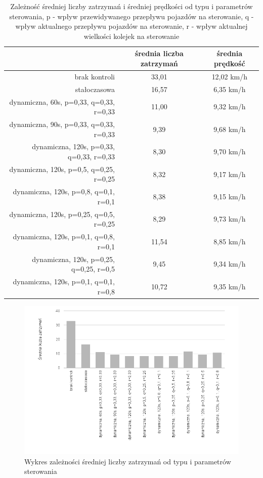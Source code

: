 \FloatBarrier
\begin{table}[h]
	\centering
	\begin{tabular}{ |r|c|c| }
		\hline
		& średnia liczba zatrzymań & średnia prędkość \\
		\hline
		brak kontroli                             & 33,01 & 12,02 km/h \\
		\hline
		stałoczasowa                              & 16,57 &  6,35 km/h \\
		\hline
		dynamiczna, 60s, p=0,33, q=0,33, r=0,33   & 11,00 &  9,32 km/h \\
		\hline
		dynamiczna, 90s, p=0,33, q=0,33, r=0,33   &  9,39 &  9,68 km/h \\
		\hline
		dynamiczna, 120s, p=0,33, q=0,33, r=0,33  &  8,30 &  9,70 km/h \\
		\hline
		dynamiczna, 120s, p=0,5, q=0,25, r=0,25   &  8,32 &  9,17 km/h \\
		\hline
		dynamiczna, 120s, p=0,8, q=0,1, r=0,1     &  8,38 &  9,15 km/h \\
		\hline
		dynamiczna, 120s, p=0,25, q=0,5, r=0,25   &  8,29 &  9,73 km/h \\
		\hline
		dynamiczna, 120s, p=0,1, q=0,8, r=0,1     & 11,54 &  8,85 km/h \\
		\hline
		dynamiczna, 120s, p=0,25, q=0,25, r=0,5   &  9,45 &  9,34 km/h \\
		\hline
		dynamiczna, 120s, p=0,1, q=0,1, r=0,8     & 10,72 &  9,35 km/h \\
		\hline
	\end{tabular}
	\caption{Zależność średniej liczby zatrzymań i średniej prędkości od typu i parametrów sterowania, p - wpływ przewidywanego przepływu pojazdów na sterowanie, q - wpływ aktualnego przepływu pojazdów na sterowanie, r - wpływ aktualnej wielkości kolejek na sterowanie}
	\label{tab:predkosc}
\end{table}
\FloatBarrier
\begin{figure}[h]
    \centering
    \includegraphics[width=1.0\textwidth]{images/wykres_liczba_zatrzyman.png}
    \caption{Wykres zależności średniej liczby zatrzymań od typu i parametrów sterowania}
    \label{fig:wykres_liczba_zatrzyman}
\end{figure}
\FloatBarrier

